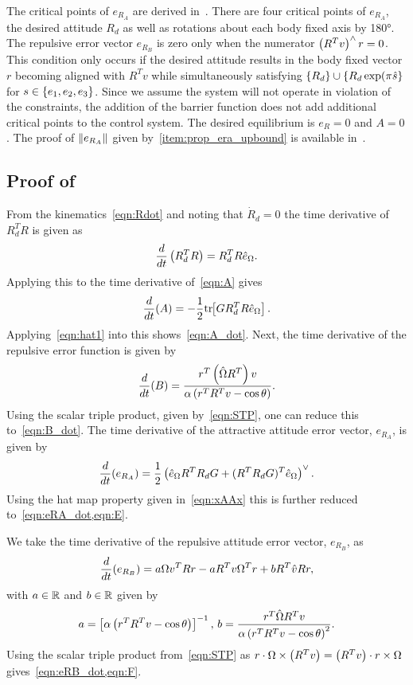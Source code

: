 \documentclass[letterpaper, 10 pt, conference]{ieeeconf}  %
\begin{document}
The critical points of \( e_{R_A} \) are derived in~\cite{bullo2004}.
There are four critical points of \( e_{R_A} \), the desired attitude \( R_d \) as well as rotations about each body fixed axis by \ang{180}.
The repulsive error vector \( e_{R_{B}} \) is zero only when the numerator \( \left( R^T v \right)^\wedge r = 0 \). 
This condition only occurs if the desired attitude results in the body fixed vector \( r \) becoming aligned with \(R^T v \) while simultaneously satisfying \(\left\{ R_d \right\} \cup \left\{ R_d \exp(\pi \hat{s} \right\} \) for \( s \in \left\{ e_1, e_2, e_3 \right\} \).
Since we assume the system will not operate in violation of the constraints, the addition of the barrier function does not add additional critical points to the control system.
The desired equilibrium is \( e_R = 0 \) and \( A = 0\).
The proof of \( \left\| e_{R_A} \right\| \) given by~\cref{item:prop_era_upbound} is available in~\cite{LeeITCST13}.
\subsection{Proof of~}\label{proof:error_dyn}
From the kinematics~\cref{eqn:Rdot} and noting that \( \dot{R}_d = 0 \) the time derivative of \( R_d^T R \) is given as
\begin{gather*}
	\frac{d }{d t} \left( R_d^T R \right) = R_d^T R \hat{e}_\Omega .
\end{gather*}
Applying this to the time derivative of~\cref{eqn:A} gives
\begin{gather*}
	\frac{d }{d t} (A) = -\frac{1}{2} \mathrm{tr}\negthickspace\left[ G R_d^T R \hat{e}_\Omega \right] .
\end{gather*}
Applying~\cref{eqn:hat1} into this shows~\cref{eqn:A_dot}.
Next, the time derivative of the repulsive error function is given by
\begin{gather*}
	\frac{d }{d t} (B) = \frac{r^T \left( \hat{\Omega} R^T \right) v}{\alpha \left( r^T R^T v - \cos \theta \right)} .
\end{gather*}
Using the scalar triple product, given by~\cref{eqn:STP}, one can reduce this to~\cref{eqn:B_dot}.
The time derivative of the attractive attitude error vector, \( e_{R_A} \), is given by
\begin{gather*}
	\frac{d }{d t} ( e_{R_A}) = \frac{1}{2} \left( \hat{e}_\Omega R^T R_d G + (R^T R_d G)^T \hat{e}_\Omega \right)^\vee .
\end{gather*}
Using the hat map property given in~\cref{eqn:xAAx} this is further reduced to~\cref{eqn:eRA_dot,eqn:E}.

We take the time derivative of the repulsive attitude error vector, \( e_{R_B} \), as
\begin{gather*}
	\frac{d }{d t}( e_{R_B} )= a \Omega v^T R r - a R^T v \Omega^T r + b R^T \hat{v} R r ,
\end{gather*}
with \( a \in \mathbb{R} \) and \( b \in \mathbb{R}\) given by 
\begin{gather*}
	a = \left[ \alpha \left( r^T R^T v - \cos \theta \right) \right]^{-1} , \,
	b = \frac{r^T \hat{\Omega} R^T v}{\alpha \left( r^T R^T v - \cos \theta \right)^2} .
\end{gather*}
Using the scalar triple product from~\cref{eqn:STP} as \( r \cdot \Omega \times \left( R^T v \right) = \left( R^T v \right) \cdot r \times \Omega \) gives~\cref{eqn:eRB_dot,eqn:F}.
\end{document}
